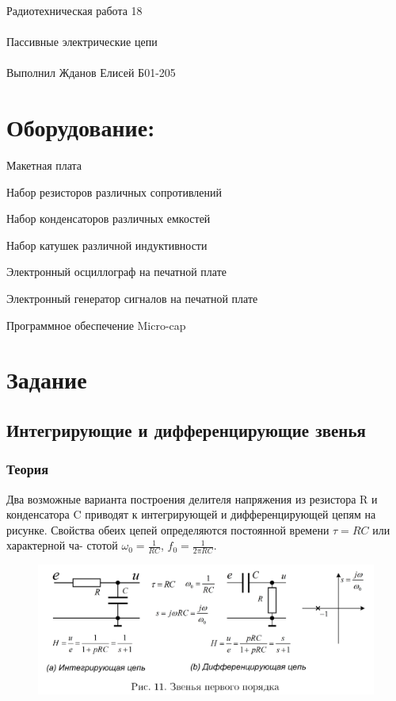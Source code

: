 \documentclass{astroedu-lab}
\begin{document}
\pagestyle{plain}

\begin{problem}{\huge Радиотехническая работа 18\\\\Пассивные электрические цепи\\\\Выполнил Жданов Елисей Б01-205}

\section{Оборудование:}

Макетная плата

Набор резисторов различных сопротивлений

Набор конденсаторов различных емкостей

Набор катушек различной индуктивности

Электронный осциллограф на печатной плате

Электронный генератор сигналов на печатной плате

Программное обеспечение Micro-cap

\section{Задание}

\subsection{Интегрирующие и дифференцирующие звенья}

\subsubsection{Теория}

Два возможные варианта построения делителя напряжения
из резистора R и конденсатора C приводят к интегрирующей
и дифференцирующей цепям на рисунке. Свойства обеих цепей
определяются постоянной времени $\tau = RC$ или характерной ча-
стотой $\omega_0 = \frac{1}{RC}$, $f_0 = \frac{1}{2 \pi R C}$.

\newpage

\begin{figure}[!h]
	\centering
	\includegraphics[width=1\textwidth]{1_1.png}
	\label{fig:boiler}
\end{figure}


\end{problem}
\end{document}
